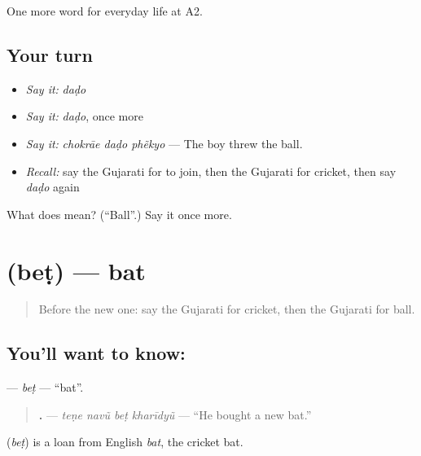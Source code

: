 \begin{grammarlens}[title={What you've built}]
One more word for everyday life at A2.
\end{grammarlens}

\subsection*{Your turn}
\begin{itemize}
\raggedright
  \item \emph{Say it:} \emph{daḍo}
  \item \emph{Say it:} \emph{daḍo}, once more
  \item \emph{Say it:} \emph{chokrāe daḍo phẽkyo} — The boy threw the ball.
  \item \emph{Recall:} say the Gujarati for to join, then the Gujarati for cricket, then say \emph{daḍo} again
\end{itemize}

\begin{tcolorbox}[breakable,colback=teal!4,colframe=teal!35!black,title={Before you move on}]
What does  mean? (\textquotedblleft{}Ball\textquotedblright{}.) Say it once more.
\end{tcolorbox}
\section[\texorpdfstring{\gu{બેટ} (beṭ)}{બેટ (beṭ)}]{ (beṭ) — bat}

\label{lesson:GU-C258-bet}



\begin{quote}
Before the new one: say the Gujarati for cricket, then the Gujarati for ball.
\end{quote}

\subsection*{You'll want to know: }
\textbf{} — \emph{beṭ} — \textquotedblleft{}bat\textquotedblright{}.

\begin{quote}
\textbf{   .} — \emph{teṇe navũ beṭ kharīdyũ} — \textquotedblleft{}He bought a new bat.\textquotedblright{}
\end{quote}

\begin{cousinweb}
\textbf{} (\emph{beṭ}) is a loan from English \emph{bat}, the cricket bat.
\end{cousinweb}

